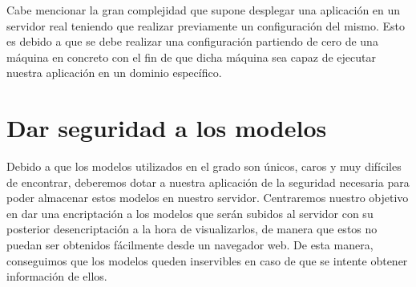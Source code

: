 Cabe mencionar la gran complejidad que supone desplegar una aplicación en un servidor real teniendo que realizar previamente un configuración del mismo. Esto es debido a que se debe realizar una configuración partiendo de cero de una máquina en concreto con el fin de que dicha máquina sea capaz de ejecutar nuestra aplicación en un dominio específico.

\section{Dar seguridad a los modelos}
Debido a que los modelos utilizados en el grado son únicos, caros y muy difíciles de encontrar, deberemos dotar a nuestra aplicación de la seguridad necesaria para poder almacenar estos modelos en nuestro servidor. Centraremos nuestro objetivo en dar una encriptación a los modelos que serán subidos al servidor con su posterior desencriptación a la hora de visualizarlos, de manera que estos no puedan ser obtenidos fácilmente desde un navegador web. De esta manera, conseguimos que los modelos queden inservibles en caso de que se intente obtener información de ellos.
